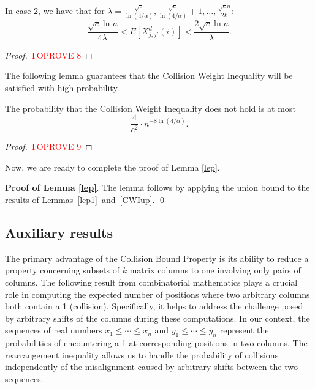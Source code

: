 \documentclass[11pt]{article}
\begin{document}
\begin{lemma}\label{case2}
In case 2, we have that for $\lambda = \frac{\sqrt{c}}{\ln({4}/{\alpha})}, 
    \frac{\sqrt{c}}{\ln({4}/{\alpha})}+1 ,\ldots, 
    \frac{\sqrt{c} n}{2 k}$:
    \[
    \frac{\sqrt{c} \ln n }{4\lambda}
    < E[X^d_{j,j'}(i)] <
     \frac{2 \sqrt{c} \ln n }{\lambda }.
    \]
\end{lemma}
\begin{proof}\textcolor{red}{TOPROVE 8}\end{proof}


The following lemma guarantees that the Collision Weight Inequality will be satisfied with high probability.


\begin{lemma}\label{CWIup}
The probability that the Collision Weight Inequality
does not hold is at most 
$$\frac{4}{c^2}\cdot n^{-8\ln(4/\alpha)} .$$
\end{lemma}
\begin{proof}\textcolor{red}{TOPROVE 9}\end{proof}

Now, we are ready to complete the proof of Lemma \ref{lep}.

\medskip
\noindent
\textbf{Proof of Lemma \ref{lep}}.
The lemma follows by applying the union bound to the results of Lemmas~\ref{lep1}~and~\ref{CWIup}. 
\qed





\subsection{Auxiliary results}
\label{prel}

The primary advantage of the Collision Bound Property is its ability to reduce 
a property concerning subsets of $k$ matrix columns to one involving only pairs of columns. 
The following result from combinatorial mathematics plays a crucial role in 
computing the expected number of positions where two arbitrary columns both contain a 1 (collision). 
Specifically, it helps to address the challenge posed by arbitrary shifts of the columns during 
these computations. In our context, the sequences of real numbers 
$x_1 \le \cdots \le x_n$ and $y_1 \le \cdots \le y_n$ represent the probabilities of encountering 
a 1 at corresponding positions in two columns. The rearrangement inequality allows us to handle 
the probability of collisions independently of the misalignment caused by arbitrary shifts between 
the two sequences.
\end{document}
